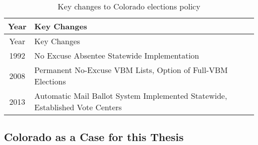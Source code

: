 \documentclass[12pt,twoside]{reedthesis}
\begin{document}
  \begin{longtable}[]{@{}cl@{}}
  \caption{Key changes to Colorado elections policy
  \label{tab:elect_policy}}\tabularnewline
  \toprule
  \begin{minipage}[b]{0.07\columnwidth}\centering\strut
  Year\strut
  \end{minipage} & \begin{minipage}[b]{0.87\columnwidth}\raggedright\strut
  Key Changes\strut
  \end{minipage}\tabularnewline
  \midrule
  \endfirsthead
  \toprule
  \begin{minipage}[b]{0.07\columnwidth}\centering\strut
  Year\strut
  \end{minipage} & \begin{minipage}[b]{0.87\columnwidth}\raggedright\strut
  Key Changes\strut
  \end{minipage}\tabularnewline
  \midrule
  \endhead
  \begin{minipage}[t]{0.07\columnwidth}\centering\strut
  1992\strut
  \end{minipage} & \begin{minipage}[t]{0.87\columnwidth}\raggedright\strut
  No Excuse Absentee Statewide Implementation\strut
  \end{minipage}\tabularnewline
  \begin{minipage}[t]{0.07\columnwidth}\centering\strut
  2008\strut
  \end{minipage} & \begin{minipage}[t]{0.87\columnwidth}\raggedright\strut
  Permanent No-Excuse VBM Lists, Option of Full-VBM Elections\strut
  \end{minipage}\tabularnewline
  \begin{minipage}[t]{0.07\columnwidth}\centering\strut
  2013\strut
  \end{minipage} & \begin{minipage}[t]{0.87\columnwidth}\raggedright\strut
  Automatic Mail Ballot System Implemented Statewide, Established Vote
  Centers\strut
  \end{minipage}\tabularnewline
  \bottomrule
  \end{longtable}
  
  \subsection{Colorado as a Case for this
  Thesis}\label{colorado-as-a-case-for-this-thesis}
  
\end{document}
